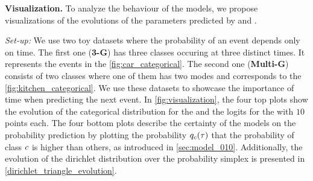 \textbf{Visualization.} To analyze the behaviour of the models, we propose visualizations of the evolutions of the parameters predicted by \DirModel and \GPModel.

\textit{Set-up:} We use two toy datasets where the probability of an event depends only on time. The first one (\textbf{3-G}) has three classes occuring at three distinct times. It represents the events in the \cref{fig:car_categorical}. The second one (\textbf{Multi-G}) consists of two classes where one of them has two modes and corresponds to the \cref{fig:kitchen_categorical}. We use these datasets to showcase the importance of time when predicting the next event. In \cref{fig:visualization}, the four top plots show the evolution of the categorical distribution for the \DirModel and the logits for the \GPModel with $10$ points each. The four bottom plots describe the certainty of the models on the probability prediction by plotting the probability $q_c(\tau)$ that the probability of class $c$ is higher than others, as introduced in \cref{sec:model_010}.
Additionally, the evolution of the dirichlet distribution over the probability simplex is presented in \cref{dirichlet_triangle_evolution}.

